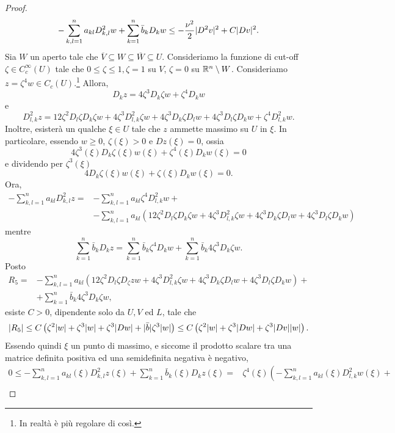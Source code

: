 \begin{proof}
	\[ -\sum_{k,l=1}^{n}a_{kl}D^2_{k,l}w + \sum_{k=1}^{n} \bar{b}_k D_k w  \le -\frac{\nu^2}{2}\lvert D^2 v\rvert^2 + C\lvert Dv\rvert^2. \]
	Sia $W$ un aperto tale che $\overline{V} \subseteq W \subseteq \overline{W} \subseteq U$. Consideriamo la funzione di cut-off $\zeta \in C^\infty_c(U)$ tale che $0\le \zeta \le 1, \zeta = 1$ su $V$, $\zeta = 0$ su $\mathbb{R}^n \setminus W$. Consideriamo $z = \zeta ^4 w \in C_c(U)$.\footnote{In realtà è più regolare di così.} Allora,
	\[ D_k z = 4 \zeta^3 D_k \zeta w + \zeta^4 D_k w \]
	e 
	\[ D^2_{l,k} z = 12\zeta^2 D_l \zeta D_k \zeta w + 4 \zeta^3 D^2_{l,k} \zeta w + 4\zeta^3 D_k\zeta D_lw + 4\zeta^3D_l\zeta D_kw + \zeta^4 D^2_{l,k}w. \]
	Inoltre, esisterà un qualche $\xi \in U$ tale che $z$ ammette massimo su $U$ in $\xi$. In particolare, essendo $w \ge 0$, $\zeta(\xi)> 0$ e $Dz(\xi) = 0$, ossia
	\[ 4\zeta^3(\xi)D_k\zeta(\xi) w(\xi) + \zeta^4(\xi)D_kw(\xi)  =0 \]
	e dividendo per $\zeta^3(\xi)$
	\begin{equation}\label{eq2Harnack}
		4D_k\zeta(\xi) w(\xi) + \zeta(\xi)D_kw(\xi)  =0.
	\end{equation}
	Ora, 
	\begin{align*}
		-\sum_{k,l=1}^n a_{kl}D^2_{k,l}z = &-\sum_{k,l=1}^n a_{kl} \zeta^4 D^2_{l,k}w + \\
		& -\sum_{k,l=1}^n a_{kl}\left(12\zeta^2 D_l \zeta D_k \zeta w + 4 \zeta^3 D^2_{l,k} \zeta w + 4\zeta^3 D_k\zeta D_lw + 4\zeta^3D_l\zeta D_kw\right)
	\end{align*}
	mentre
	\[ \sum_{k=1}^n \bar{b}_k D_k z =  \sum_{k=1}^n \bar{b}_k \zeta^4 D_k w + \sum_{k=1}^n \bar{b}_k 4 \zeta^3 D_k \zeta w. \]
	Posto
	\begin{align*}
		R_5 =  &-\sum_{k,l=1}^n a_{kl}\left(12\zeta^2 D_l \zeta D_\zeta z w + 4 \zeta^3 D^2_{l,k} \zeta w + 4\zeta^3 D_k\zeta D_lw + 4\zeta^3D_l\zeta D_kw\right) + \\
		&+ \sum_{k=1}^n \bar{b}_k 4 \zeta^3 D_k \zeta w,
	\end{align*}
	esiste $C>0$, dipendente solo da $U,V$ ed $L$, tale che
	\[ \lvert R_5\rvert \le C\left( \zeta^2 \lvert w\rvert + \zeta^3 \lvert w\rvert + \zeta^3\lvert Dw\rvert + \lvert\bar{b}\rvert \zeta^3 \lvert w\rvert \right) \le C\left( \zeta^2 \lvert w\rvert + \zeta^3\lvert Dw\rvert + \zeta^3\lvert Dv\rvert  \lvert w\rvert \right).  \]
	Essendo quindi $\xi$ un punto di massimo, e siccome il prodotto scalare tra una matrice definita positiva ed una semidefinita negativa è negativo,
	\begin{align*}
		0\le  -\sum_{k,l=1}^n a_{kl}(\xi)D^2_{k,l}z(\xi) + \sum_{k=1}^n \bar{b}_k(\xi) D_k z(\xi) = &\zeta^4(\xi)\left(-\sum_{k,l=1}^n a_{kl}(\xi) D^2_{l,k}w(\xi) + \right. \\

\end{align*}
\end{proof}
